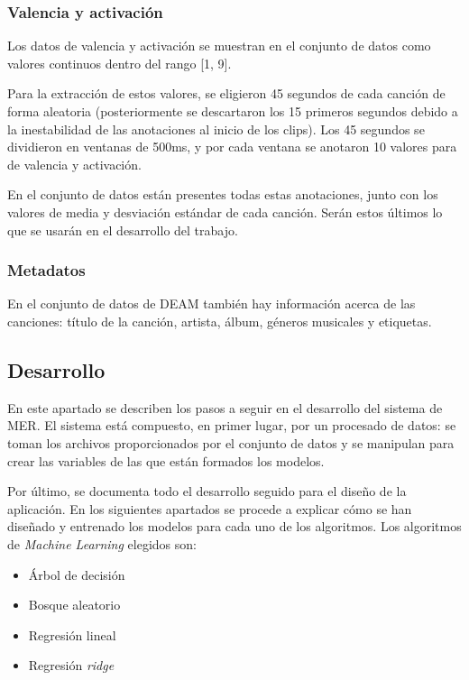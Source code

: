 \documentclass[12pt,a4paper,Spanish]{article}
\begin{document}
\subsubsection{Valencia y activación}
Los datos de valencia y activación se muestran en el conjunto de datos como valores continuos dentro del rango [1, 9].
\newline

Para la extracción de estos valores, se eligieron 45 segundos de cada canción de forma aleatoria (posteriormente se descartaron los 15 primeros segundos debido a la inestabilidad de las anotaciones al inicio de los clips). Los 45 segundos se dividieron en ventanas de 500ms, y por cada ventana se anotaron 10 valores para de valencia y activación.
\newline

En el conjunto de datos están presentes todas estas anotaciones, junto con los valores de media y desviación estándar de cada canción. Serán estos últimos lo que se usarán en el desarrollo del trabajo.



\subsubsection{Metadatos}
En el conjunto de datos de DEAM \cite{AlajankiEmoInMusicAnalysis} también hay información acerca de las canciones: título de la canción, artista, álbum, géneros musicales y etiquetas.




\subsection{Desarrollo}
En este apartado se describen los pasos a seguir en el desarrollo del sistema de MER. El sistema está compuesto, en primer lugar, por un procesado de datos: se toman los archivos proporcionados por el conjunto de datos y se manipulan para crear las variables de las que están formados los modelos.
\newline

Por último, se documenta todo el desarrollo seguido para el diseño de la aplicación. En los siguientes apartados se procede a explicar cómo se han diseñado y entrenado los modelos  para cada uno de los algoritmos. Los algoritmos de \textit{Machine Learning} elegidos son:
\begin{itemize}
	\item Árbol de decisión
	\item Bosque aleatorio
	\item Regresión lineal
	\item Regresión \textit{ridge}
\end{itemize}
\end{document}
